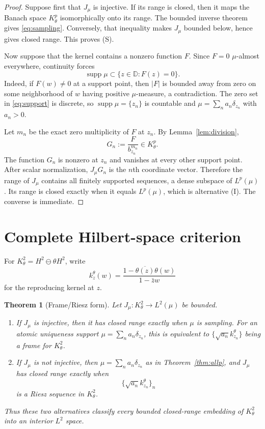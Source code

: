 \documentclass[10pt]{article}
\newtheorem{theorem}{Theorem}
\newcommand{\D}{\mathbb D}
\begin{document}
\begin{proof}
Suppose first that $J_\mu$ is injective.  If its range is closed, then it maps
the Banach space $K_\theta^p$ isomorphically onto its range.  The bounded
inverse theorem gives \eqref{eq:sampling}.  Conversely, that inequality makes
$J_\mu$ bounded below, hence gives closed range.  This proves (S).

Now suppose that the kernel contains a nonzero function $F$.  Since
$F=0$ $\mu$-almost everywhere, continuity forces
\begin{equation}\label{eq:support}
 \operatorname{supp}\mu\subset\{z\in\D:F(z)=0\}.
\end{equation}
Indeed, if $F(w)\ne0$ at a support point, then $|F|$ is bounded away from zero
on some neighborhood of $w$ having positive $\mu$-measure, a contradiction.
The zero set in \eqref{eq:support} is discrete, so
$\operatorname{supp}\mu=\{z_n\}$ is countable and
$\mu=\sum_n a_n\delta_{z_n}$ with $a_n>0$.

Let $m_n$ be the exact zero multiplicity of $F$ at $z_n$.  By
Lemma~\ref{lem:division},
\[
 G_n:=\frac{F}{b_{z_n}^{m_n}}\in K_\theta^p.
\]
The function $G_n$ is nonzero at $z_n$ and vanishes at every other support
point.  After scalar normalization, $J_\mu G_n$ is the $n$th coordinate
vector.  Therefore the range of $J_\mu$ contains all finitely supported
sequences, a dense subspace of $L^p(\mu)$.  Its range is closed exactly when
it equals $L^p(\mu)$, which is alternative (I).  The converse is immediate.
\end{proof}

\section{Complete Hilbert-space criterion}

For $K_\theta^2=H^2\ominus\theta H^2$, write
\[
 k_z^\theta(w)=\frac{1-\overline{\theta(z)}\theta(w)}{1-\bar z w}
\]
for the reproducing kernel at $z$.

\begin{theorem}[Frame/Riesz form]\label{thm:hilbert}
Let $J_\mu:K_\theta^2\to L^2(\mu)$ be bounded.
\begin{enumerate}
\item If $J_\mu$ is injective, then it has closed range exactly when $\mu$ is
sampling.  For an atomic uniqueness support
$\mu=\sum_n a_n\delta_{z_n}$, this is equivalent to
$\{\sqrt{a_n}k_{z_n}^\theta\}$ being a frame for $K_\theta^2$.
\item If $J_\mu$ is not injective, then $\mu=\sum_n a_n\delta_{z_n}$ as in
Theorem~\ref{thm:allp}, and $J_\mu$ has closed range exactly when
\begin{equation}\label{eq:riesz}
 \{\sqrt{a_n}k_{z_n}^\theta\}_n
\end{equation}
is a Riesz sequence in $K_\theta^2$.
\end{enumerate}
Thus these two alternatives classify every bounded closed-range embedding of
$K_\theta^2$ into an interior $L^2$ space.
\end{theorem}
\end{document}
